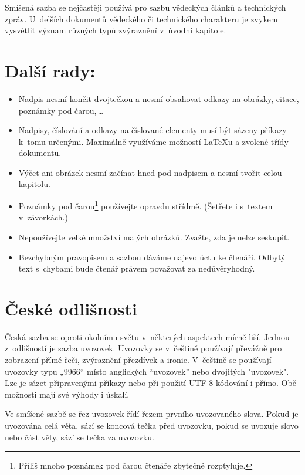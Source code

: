 \documentclass[10pt,a4paper,twocolumn]{article}
\begin{document}
Smíšená sazba se nejčastěji používá pro sazbu vě\-dec\-kých
článků a technických zpráv. U~delších dokumentů vědeckého či
technického charakteru je zvykem vysvětlit význam různých typů
zvýraznění v~úvodní kapitole.


\section{Další rady:} \label{dalsirady}
\begin{itemize}
\item Nadpis nesmí končit dvojtečkou a nesmí obsahovat odkazy na
obrázky, citace, poznámky pod čarou,\,\dots

\item Nadpisy, číslování a odkazy na číslované elementy mu\-sí
být sázeny příkazy k~tomu určenými. Maximálně využíváme
možností \LaTeX u a zvolené třídy do\-ku\-men\-tu.

\item Výčet ani obrázek nesmí začínat hned pod nadpisem a nesmí
tvořit celou kapitolu.

\item Poznámky pod čarou\footnote{Příliš mnoho poznámek pod
čarou čtenáře zbytečně rozptyluje.} používejte opravdu
střídmě. (Šetřete i s~textem v~závorkách.)

\item Nepoužívejte velké množství malých obrázků. Zvažte, zda
je nelze seskupit.

\item Bezchybným pravopisem a sazbou dáváme najevo úctu ke
čtenáři. Odbytý text s~chybami bude čtenář právem považovat za
nedůvěryhodný.
\end{itemize}

\section{České odlišnosti}

Česká sazba se oproti okolnímu světu v~některých aspektech
mírně liší. Jednou z~odlišností je sazba uvozovek. Uvozovky se
v~češtině používají převážně pro zobrazení přímé řeči,
zvýraznění přezdívek a ironie. V~češtině se používají
uvozovky typu „9966“ místo anglických “uvozovek” nebo dvojitých
"uvozovek". Lze je sázet připravenými příkazy nebo při použití
UTF-8 kódování i přímo. Obě možnosti mají své výhody i úskalí.

Ve smíšené sazbě se řez uvozovek řídí řezem prvního
uvozovaného slova. Pokud je uvozována celá věta, sází se koncová
tečka před uvozovku, pokud se uvozuje slovo nebo část věty, sází
se tečka za uvozovku.
\end{document}
